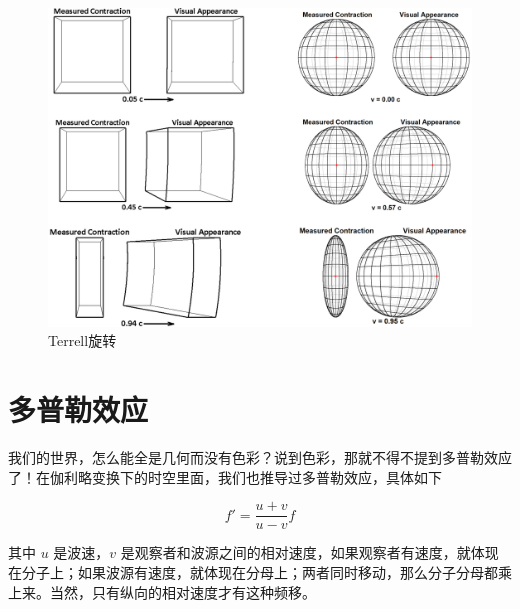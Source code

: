 \documentclass[12pt, a4paper, oneside]{ctexbook}
\begin{document}
\begin{figure}[H]
	\centering
	\includegraphics[scale=0.6]{figures/Terrell-rotation.png}
	\caption{Terrell旋转}
\end{figure}

\section{多普勒效应}

我们的世界，怎么能全是几何而没有色彩？说到色彩，那就不得不提到多普勒效应了！在伽利略变换下的时空里面，我们也推导过多普勒效应，具体如下

\begin{equation}
	f'=\frac{u+v}{u-v}f
\end{equation}

其中 $u$ 是波速，$v$ 是观察者和波源之间的相对速度，如果观察者有速度，就体现在分子上；如果波源有速度，就体现在分母上；两者同时移动，那么分子分母都乘上来。当然，只有纵向的相对速度才有这种频移。
\end{document}
